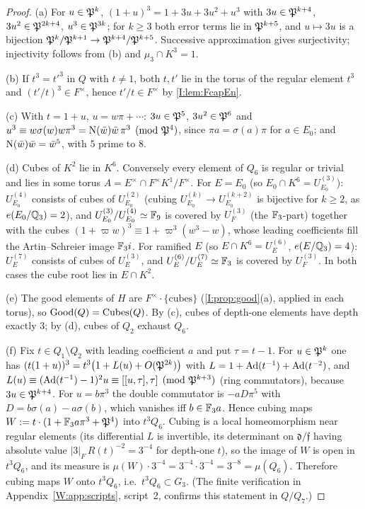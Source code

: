 \begin{proof}
(a) For $u\in\mathfrak P^k$, $(1+u)^3=1+3u+3u^2+u^3$ with $3u\in\mathfrak P^{k+4}$,
$3u^2\in\mathfrak P^{2k+4}$, $u^3\in\mathfrak P^{3k}$; for $k\ge3$ both error terms
lie in $\mathfrak P^{k+5}$, and $u\mapsto3u$ is a bijection
$\mathfrak P^k/\mathfrak P^{k+1}\to\mathfrak P^{k+4}/\mathfrak P^{k+5}$.  Successive approximation
gives surjectivity; injectivity follows from (b) and
$\mu_3\cap K^3=1$.

(b) If $t^3=t'^3$ in $Q$ with $t\ne1$, both $t,t'$ lie in the torus
of the regular element $t^3$ and $(t'/t)^3\in F^\times$, hence
$t'/t\in F^\times$ by \cref{I:lem:FcapEn}.

(c) With $t=1+u$, $u=w\pi+\cdots$: $3u\in\mathfrak P^5$, $3u^2\in\mathfrak P^6$ and
$u^3\equiv w\sigma(w)w\pi^3=\operatorname N(\bar w)\bar w\,\pi^3 \pmod{\mathfrak P^4}$,
since $\pi a=\sigma(a)\pi$ for $a\in E_0$; and
$\operatorname N(\bar w)\bar w=\bar w^{5}$, with $5$ prime to $8$.

(d) Cubes of $K^2$ lie in $K^6$.  Conversely every element of $Q_6$ is
regular or trivial and lies in some torus $A=E^\times\cap F^\times K^1/F^\times$.
For $E=E_0$ (so $E_0\cap K^6=U^{(3)}_{E_0}$): $U^{(4)}_{E_0}$ consists of
cubes of $U^{(2)}_{E_0}$ (cubing $U^{(k)}_{E_0}\to U^{(k+2)}_{E_0}$ is bijective
for $k\ge2$, as $e(E_0/\mathbb Q_3)=2$), and $U^{(3)}_{E_0}/U^{(4)}_{E_0}\simeq\mathbb F_9$ is
covered by $U_F^{(3)}$ (the $\mathbb F_3$-part) together with the cubes
$(1+\varpi w)^3\equiv1+\varpi^3(w^3-w)$, whose leading coefficients
fill the Artin--Schreier image $\mathbb F_3 i$.  For ramified $E$
(so $E\cap K^6=U^{(6)}_E$, $e(E/\mathbb Q_3)=4$): $U^{(7)}_E$ consists of cubes of
$U^{(3)}_E$, and $U^{(6)}_E/U^{(7)}_E\simeq\mathbb F_3$ is covered by $U_F^{(3)}$.
In both cases the cube root lies in $E\cap K^2$.

(e) The good elements of $H$ are $F^\times\cdot\{\text{cubes}\}$
(\cref{I:prop:good}(a), applied in each torus), so
$\mathrm{Good}(Q)=\mathrm{Cubes}(Q)$.  By (c), cubes of depth-one elements have depth
exactly $3$; by (d), cubes of $Q_2$ exhaust $Q_6$.

(f) Fix $t\in Q_1\setminus Q_2$ with leading coefficient $a$ and put
$\tau=t-1$.  For $u\in\mathfrak P^k$ one has
$(t(1+u))^3=t^3\bigl(1+L(u)+O(\mathfrak P^{2k})\bigr)$ with
$L=1+\operatorname{Ad}(t^{-1})+\operatorname{Ad}(t^{-2})$, and
$L(u)\equiv(\operatorname{Ad}(t^{-1})-1)^2u\equiv[[u,\tau],\tau]\pmod{\mathfrak P^{k+3}}$
(ring commutators), because $3u\in\mathfrak P^{k+4}$.  For $u=b\pi^3$ the
double commutator is $-aD\pi^5$ with $D=b\sigma(a)-a\sigma(b)$, which
vanishes iff $b\in\mathbb F_3a$.  Hence cubing maps
$W:=t\cdot(1+\mathbb F_3a\pi^3+\mathfrak P^4)$ into $t^3Q_6$.  Cubing is a local
homeomorphism near regular elements (its differential $L$ is
invertible, its determinant on $\mathfrak d/\mathfrak f$ having absolute
value $|3|_F\,R(t)^{-2}=3^{-4}$ for depth-one $t$), so the image of
$W$ is open in $t^3Q_6$, and its measure is
$\mu(W)\cdot3^{-4}=3^{-4}\cdot3^{-4}=3^{-8}=\mu(Q_6)$.  Therefore
cubing maps $W$ onto $t^3Q_6$, i.e.\ $t^3Q_6\subset G_3$.
(The finite verification in Appendix~\ref{W:app:scripts}, script~2,
confirms this statement in $Q/Q_7$.)


\end{proof}
